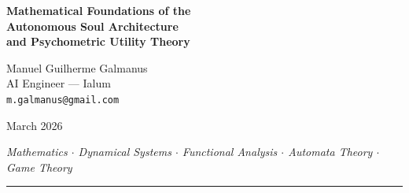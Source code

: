 \documentclass[12pt,a4paper]{article}
\theoremstyle{plain}
\theoremstyle{definition}
\theoremstyle{remark}
\newcommand{\R}{\mathbb{R}}
\begin{document}
\begin{center}
{\LARGE \textbf{Mathematical Foundations of the\\[0.3em]
Autonomous Soul Architecture\\[0.3em]
and Psychometric Utility Theory}}

\vspace{1.5em}

{\large Manuel Guilherme Galmanus}\\[0.3em]
{\small AI Engineer --- Ialum}\\
{\small \texttt{m.galmanus@gmail.com}}

\vspace{1em}

{\small March 2026}

\vspace{1.5em}

\textit{Mathematics $\cdot$ Dynamical Systems $\cdot$ Functional Analysis $\cdot$ Automata Theory $\cdot$ Game Theory}

\vspace{1em}

\rule{0.8\textwidth}{0.4pt}
\end{center}

\begin{abstract}
This document provides the formal mathematical foundations for the Autonomous Soul Architecture (ASA) and Psychometric Utility Theory (PUT), suitable for review by the mathematical community. We formalize the psychometric state space as a compact subset of~$\R^9$, prove boundedness and monotonicity properties of the Psychic Utility Function, establish existence, uniqueness, and regularity results for the coupled ODE system via the Picard--Lindel\"of theorem and Nagumo's invariance theorem, perform Lyapunov stability analysis of equilibrium attractors, classify the shadow rupture event as a fold catastrophe in the sense of Thom, model the consciousness state machine as a weighted finite automaton with proven ergodicity, formalize the agent army as a recursive loyalty graph with constitutionally immutable fixed points, and prove evolutionary stability of the constitutional truths in the sense of Maynard Smith. We establish connections to Von~Neumann--Morgenstern expected utility theory, Kahneman--Tversky prospect theory, the BDI agent model, and Milner's labeled transition systems.
\end{abstract}

\tableofcontents
\newpage
\end{document}
